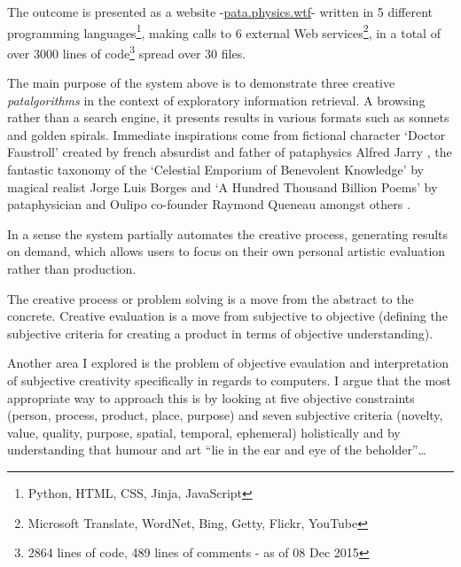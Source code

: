The outcome is presented as a website -\url{pata.physics.wtf}- written in 5 different programming languages\footnote{Python, HTML, CSS, Jinja, JavaScript}, making calls to 6 external Web services\footnote{Microsoft Translate, WordNet, Bing, Getty, Flickr, YouTube}, in a total of over 3000 lines of code\footnote{2864 lines of code, 489 lines of comments - as of 08 Dec 2015} spread over 30 files.

The main purpose of the system above is to demonstrate three creative \textit{patalgorithms} in the context of exploratory information retrieval. A browsing rather than a search engine, it presents results in various formats such as sonnets and golden spirals. Immediate inspirations come from fictional character `Doctor Faustroll' created by french absurdist and father of pataphysics Alfred Jarry \autocite{Jarry1996}, the fantastic taxonomy of the `Celestial Emporium of Benevolent Knowledge' by magical realist Jorge Luis Borges \autocite{Borges2000} and `A Hundred Thousand Billion Poems' by pataphysician and Oulipo co-founder Raymond Queneau amongst others \autocite{Queneau1961}.

In a sense the system partially automates the creative process, generating results on demand, which allows users to focus on their own personal artistic evaluation rather than production.


\begin{draft}
  The creative process or problem solving is a move from the abstract to the concrete. Creative evaluation is a move from subjective to objective (defining the subjective criteria for creating a product in terms of objective understanding).
\end{draft}

Another area I explored is the problem of objective evaulation and interpretation of subjective creativity specifically in regards to computers. I argue that the most appropriate way to approach this is by looking at five objective constraints (person, process, product, place, purpose) and seven subjective criteria (novelty, value, quality, purpose, spatial, temporal, ephemeral) holistically and by understanding that humour and art ``lie in the ear and eye of the beholder''\ldots

